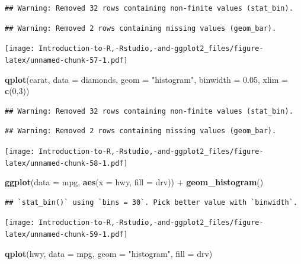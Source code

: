 \documentclass[]{book}
\newenvironment{Shaded}{\begin{snugshade}}{\end{snugshade}}
\newcommand{\KeywordTok}[1]{\textcolor[rgb]{0.13,0.29,0.53}{\textbf{{#1}}}}
\newcommand{\DataTypeTok}[1]{\textcolor[rgb]{0.13,0.29,0.53}{{#1}}}
\newcommand{\DecValTok}[1]{\textcolor[rgb]{0.00,0.00,0.81}{{#1}}}
\newcommand{\FloatTok}[1]{\textcolor[rgb]{0.00,0.00,0.81}{{#1}}}
\newcommand{\StringTok}[1]{\textcolor[rgb]{0.31,0.60,0.02}{{#1}}}
\newcommand{\NormalTok}[1]{{#1}}
\begin{document}
\begin{verbatim}
## Warning: Removed 32 rows containing non-finite values (stat_bin).
\end{verbatim}

\begin{verbatim}
## Warning: Removed 2 rows containing missing values (geom_bar).
\end{verbatim}

\texttt{[image: Introduction-to-R,-Rstudio,-and-ggplot2\_files/figure-latex/unnamed-chunk-57-1.pdf]}

\begin{Shaded}
\begin{Highlighting}[]
\KeywordTok{qplot}\NormalTok{(carat, }\DataTypeTok{data =} \NormalTok{diamonds, }\DataTypeTok{geom =} \StringTok{"histogram"}\NormalTok{, }\DataTypeTok{binwidth =} \FloatTok{0.05}\NormalTok{, }\DataTypeTok{xlim =} \KeywordTok{c}\NormalTok{(}\DecValTok{0}\NormalTok{,}\DecValTok{3}\NormalTok{))}
\end{Highlighting}
\end{Shaded}

\begin{verbatim}
## Warning: Removed 32 rows containing non-finite values (stat_bin).
\end{verbatim}

\begin{verbatim}
## Warning: Removed 2 rows containing missing values (geom_bar).
\end{verbatim}

\texttt{[image: Introduction-to-R,-Rstudio,-and-ggplot2\_files/figure-latex/unnamed-chunk-58-1.pdf]}

\begin{Shaded}
\begin{Highlighting}[]
\KeywordTok{ggplot}\NormalTok{(}\DataTypeTok{data =} \NormalTok{mpg, }\KeywordTok{aes}\NormalTok{(}\DataTypeTok{x =} \NormalTok{hwy, }\DataTypeTok{fill =} \NormalTok{drv)) +}\StringTok{ }\KeywordTok{geom_histogram}\NormalTok{() }
\end{Highlighting}
\end{Shaded}

\begin{verbatim}
## `stat_bin()` using `bins = 30`. Pick better value with `binwidth`.
\end{verbatim}

\texttt{[image: Introduction-to-R,-Rstudio,-and-ggplot2\_files/figure-latex/unnamed-chunk-59-1.pdf]}

\begin{Shaded}
\begin{Highlighting}[]
\KeywordTok{qplot}\NormalTok{(hwy, }\DataTypeTok{data =} \NormalTok{mpg, }\DataTypeTok{geom =} \StringTok{"histogram"}\NormalTok{, }\DataTypeTok{fill =} \NormalTok{drv)}
\end{Highlighting}
\end{Shaded}
\end{document}
